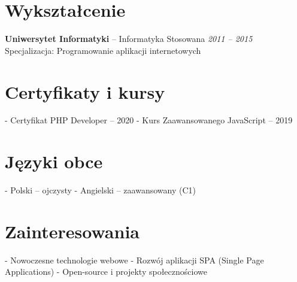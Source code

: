 \documentclass[a4paper,10pt]{article}
\begin{document}
\section{Wykształcenie}
\textbf{Uniwersytet Informatyki} – Informatyka Stosowana 
\hfill \textit{2011 – 2015}\\
Specjalizacja: Programowanie aplikacji internetowych

\section{Certyfikaty i kursy}
- Certyfikat PHP Developer – 2020
- Kurs Zaawansowanego JavaScript – 2019

\section{Języki obce}
- Polski – ojczysty
- Angielski – zaawansowany (C1)

\section{Zainteresowania}
- Nowoczesne technologie webowe
- Rozwój aplikacji SPA (Single Page Applications)
- Open-source i projekty społecznościowe
\end{document}
